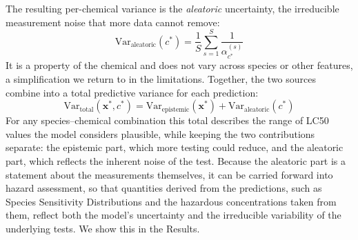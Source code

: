 The resulting per-chemical variance is the \emph{aleatoric} uncertainty, the irreducible measurement noise that more data cannot remove:
\begin{equation}
    \text{Var}_{\text{aleatoric}}(c^*) = \frac{1}{S} \sum_{s=1}^{S} \frac{1}{\alpha_{c^*}^{(s)}}
    \label{eq:aleatoric}
\end{equation}
It is a property of the chemical and does not vary across species or other features, a simplification we return to in the limitations. Together, the two sources combine into a total predictive variance for each prediction:
\begin{equation}
    \text{Var}_{\text{total}}(\mathbf{x}^*, c^*) = \text{Var}_{\text{epistemic}}(\mathbf{x}^*) + \text{Var}_{\text{aleatoric}}(c^*)
    \label{eq:total}
\end{equation}
For any species--chemical combination this total describes the range of LC50 values the model considers plausible, while keeping the two contributions separate: the epistemic part, which more testing could reduce, and the aleatoric part, which reflects the inherent noise of the test. Because the aleatoric part is a statement about the measurements themselves, it can be carried forward into hazard assessment, so that quantities derived from the predictions, such as Species Sensitivity Distributions and the hazardous concentrations taken from them, reflect both the model's uncertainty and the irreducible variability of the underlying tests. We show this in the Results.